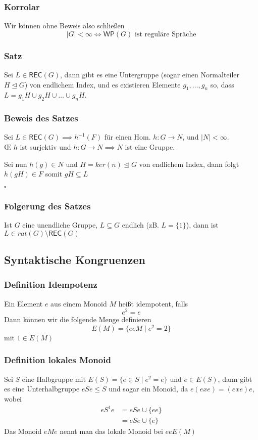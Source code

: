 \documentclass[12pt, german]{article}
\newcommand{\inv}{^{-1}}
\newcommand{\rec}{\mathsf{REC}}
\newcommand{\wop}{\mathsf{WP}}
\newcommand{\bewiesen}{
	
	\begin{flushright}
		$\square$  \\
\end{flushright}}
\begin{document}
	\subsubsection{Korrolar}
	Wir können ohne Beweis also schließen $$|G| < \infty \iff \wop(G) \text{ ist reguläre Spräche}$$
	
	\subsubsection{Satz}
	Sei $L \in \rec(G)$, dann gibt es eine Untergruppe (sogar einen Normalteiler $H \trianglelefteq G$) von endlichem Index, und es existieren Elemente
	$g_1, \ldots, g_n$ so, dass $L = g_1H \cup g_2H \cup \ldots \cup g_nH$.   
	
	\subsubsection{Beweis des Satzes}
	Sei $L \in \rec(G) \implies h\inv(F)$ für einen Hom. $h:G \to N$, und $|N| < \infty$. \\
	
	\OE $\, \, h$ ist surjektiv und $h:G \to N \implies N$  ist eine Gruppe. 
	
	Sei nun $h(g) \in N$ und $H= ker(n) \trianglelefteq G$ von endlichem Index, dann folgt $h(gH) \in F$ somit $gH \subseteq L$
	\bewiesen
	
	\subsubsection{Folgerung des Satzes}	
	Ist $G$ eine unendliche Gruppe, $L \subseteq G$ endlich (zB. $L = \{1\}$), dann ist $L \in rat(G) \setminus \rec(G)$
	
\subsection{Syntaktische Kongruenzen}
\subsubsection{Definition Idempotenz}
	Ein Element $e$ aus einem Monoid $M$ heißt idempotent, falls $$e^2 = e$$
	Dann können wir die folgende Menge definieren $$E(M) = \{ eeM \mid e^2 = 2\}$$ mit $1\in E(M)$
	
\subsubsection{Definition lokales Monoid}
	Sei $S$ eine Halbgruppe mit $E(S) = \{e \in S \mid e^2 = e\}$  und $e \in E(S)$, dann gibt es eine Unterhalbgruppe $eSe \leq S$ und sogar ein Monoid, da 	$e(exe) = (exe)e$, wobei 
	\begin{align*}
		eS^1e &= eSe \cup \{ee\} \\
		&=eSe \cup \{e\}
	\end{align*}
	Das Monoid $eMe$ nennt man das lokale Monoid bei $eeE(M)$
	
\end{document}
